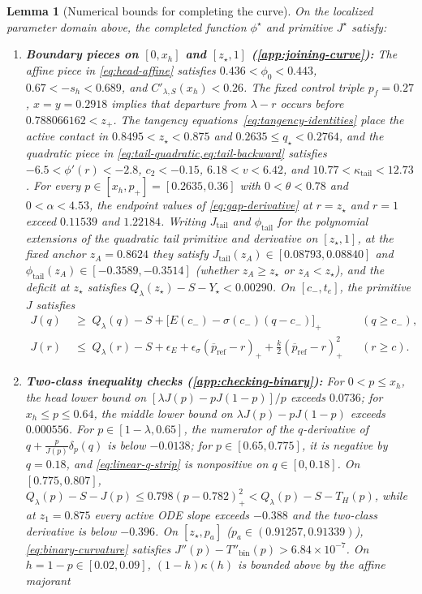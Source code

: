 \documentclass[11pt]{article}
\numberwithin{equation}{section}
\theoremstyle{plain}
\newtheorem{lemma}[theorem]{Lemma}
\theoremstyle{definition}
\newcommand{\1}{\mathbf{1}}
\begin{document}
\begin{lemma}[Numerical bounds for completing the curve]
\label{lem:completion-bounds}
On the localized parameter domain above, the completed function $\phi^\star$ and primitive $J^\star$ satisfy:
\begin{enumerate}[label=(\roman*)]
  \item \textbf{Boundary pieces on $[0, x_h]$ and $[z_\star, 1]$ (\cref{app:joining-curve}):} The affine piece in \cref{eq:head-affine} satisfies $0.436 < \phi_0 < 0.443$, $0.67 < -s_h < 0.689$, and $C'_{\lambda, S}(x_h) < 0.26$. The fixed control triple $p_f = 0.27$, $x = y = 0.2918$ implies that departure from $\lambda - r$ occurs before $0.788066162 < z_+$. The tangency equations~\eqref{eq:tangency-identities} place the active contact in $0.8495 < z_\star < 0.875$ and $0.2635 \le q_\star < 0.2764$, and the quadratic piece in \cref{eq:tail-quadratic,eq:tail-backward} satisfies $-6.5 < \phi'(r) < -2.8$, $c_2 < -0.15$, $6.18 < v < 6.42$, and $10.77 < \kappa_{\mathrm{tail}} < 12.73$. For every $p \in [x_h, p_+] = [0.2635, 0.36]$ with $0 < \theta < 0.78$ and $0 < \alpha < 4.53$, the endpoint values of \cref{eq:gap-derivative} at $r = z_\star$ and $r = 1$ exceed $0.11539$ and $1.22184$. Writing $J_{\mathrm{tail}}$ and $\phi_{\mathrm{tail}}$ for the polynomial extensions of the quadratic tail primitive and derivative on $[z_\star, 1]$, at the fixed anchor $z_A = 0.8624$ they satisfy $J_{\mathrm{tail}}(z_A) \in [0.08793, 0.08840]$ and $\phi_{\mathrm{tail}}(z_A) \in [-0.3589, -0.3514]$ (whether $z_A \ge z_\star$ or $z_A < z_\star$), and the deficit at $z_\star$ satisfies $Q_\lambda(z_\star) - S - Y_\star < 0.00290$. On $[c_-, t_e]$, the primitive $J$ satisfies
  \begin{align*}
    J(q) &\;\ge\; Q_\lambda(q) - S + \bigl[E(c_-) - \sigma(c_-)(q - c_-)\bigr]_+ && (q \ge c_-), \\
    J(r) &\;\le\; Q_\lambda(r) - S + \epsilon_E + \epsilon_\sigma(\overline{p}_{\mathrm{ref}} - r)_+ + \frac{k}{2}(\overline{p}_{\mathrm{ref}} - r)_+^2 && (r \ge c).
  \end{align*}
  \item \textbf{Two-class inequality checks (\cref{app:checking-binary}):} For $0<p\le x_h$, the head lower bound on $[\lambda J(p)-pJ(1-p)]/p$ exceeds $0.0736$; for $x_h\le p\le0.64$, the middle lower bound on $\lambda J(p)-pJ(1-p)$ exceeds $0.000556$. For $p \in [1 - \lambda, 0.65]$, the numerator of the $q$-derivative of $q + \frac{p}{J(p)}\delta_p(q)$ is below $-0.0138$; for $p \in [0.65, 0.775]$, it is negative by $q = 0.18$, and \cref{eq:linear-q-strip} is nonpositive on $q \in [0, 0.18]$. On $[0.775, 0.807]$, $Q_\lambda(p) - S - J(p) \le 0.798(p - 0.782)_+^2 < Q_\lambda(p) - S - T_H(p)$, while at $z_1 = 0.875$ every active ODE slope exceeds $-0.388$ and the two-class derivative is below $-0.396$. On $[z_\star, p_a]$ ($p_a \in (0.91257, 0.91339)$), \cref{eq:binary-curvature} satisfies $J''(p) - T''_{\mathrm{bin}}(p) > 6.84 \times 10^{-7}$. On $h = 1 - p \in [0.02, 0.09]$, $(1 - h)\kappa(h)$ is bounded above by the affine majorant

\end{enumerate}
\end{lemma}
\end{document}
